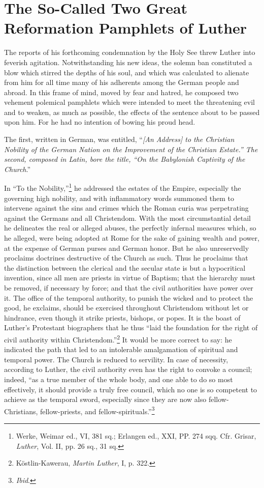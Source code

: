 \section{The So-Called Two Great Reformation Pamphlets of Luther}

The reports of his forthcoming condemnation by the Holy See
threw Luther into feverish agitation. Notwithstanding his new ideas,
the solemn ban constituted a blow which stirred the depths of his
soul, and which was calculated to alienate from him for all time
many of his adherents among the German people and abroad. In this
frame of mind, moved by fear and hatred, he composed two vehement
polemical pamphlets which were intended to meet the threatening
evil and to weaken, as much as possible, the effects of the sentence
about to be passed upon him. For he had no intention of bowing his
proud head.

The first, written in German, was entitled, ``\textit{[An Address] to
the Christian Nobility of the German Nation on the Improvement
of the Christian Estate.” The second, composed in Latin, bore the
title, “On the Babylonish Captivity of the Church}.''

In “To the Nobility,”\footnote
{Werke, Weimar ed., VI, 381 sq.; Erlangen ed., XXI, PP. 274 sqq. Cfr. Grisar, \textit{Luther},
Vol. II, pp. 26 sq., 31 sq.}
he addressed the estates of the Empire,
especially the governing high nobility, and with inflammatory words
summoned them to intervene against the sins and crimes which the
Roman curia was perpetrating against the Germans and all Christendom.
With the most circumstantial detail he delineates the real or
alleged abuses, the perfectly infernal measures which, so he alleged,
were being adopted at Rome for the sake of gaining wealth and
power, at the expense of German purses and German honor. But he
also unreservedly proclaims doctrines destructive of the Church as
such. Thus he proclaims that the distinction between the clerical and
the secular state is but a hypocritical invention, since all men are
priests in virtue of Baptism; that the hierarchy must be removed, if
necessary by force; and that the civil authorities have power over it.
The office of the temporal authority, to punish the wicked and to protect
the good, he exclaims, should be exercised throughout Christendom
without let or hindrance, even though it strike priests, bishops,
or popes. It is the boast of Luther’s Protestant biographers that he
thus “laid the foundation for the right of civil authority within
Christendom.”\footnote{Köstlin-Kawerau, \textit{Martin Luther}, I, p. 322.}
It would be more correct to say: he indicated the
path that led to an intolerable amalgamation of spiritual and temporal
power. The Church is reduced to servility. In case of necessity, according
to Luther, the civil authority even has the right to convoke a
council; indeed, “as a true member of the whole body, and one able
to do so most effectively, it should provide a truly free council, which
no one is so competent to achieve as the temporal sword, especially
since they are now also fellow-Christians, fellow-priests, and fellow-spirituals.”\footnote{\textit{Ibid}.}

